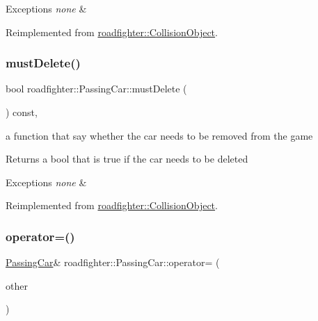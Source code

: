 \begin{DoxyExceptions}{Exceptions}
{\em none} & \\
\hline
\end{DoxyExceptions}


Reimplemented from \hyperlink{classroadfighter_1_1CollisionObject_a9a5265d810f0ed7583b60046ab3fa88c}{roadfighter\+::\+Collision\+Object}.

\mbox{\label{classroadfighter_1_1PassingCar_a96b365c19d4e6e940d3827319434a022}} 
\subsubsection{\texorpdfstring{must\+Delete()}{mustDelete()}}
{\footnotesize\ttfamily bool roadfighter\+::\+Passing\+Car\+::must\+Delete (\begin{DoxyParamCaption}{ }\end{DoxyParamCaption}) const\hspace{0.3cm}{\ttfamily [override]}, {\ttfamily [virtual]}}

a function that say whether the car needs to be removed from the game \begin{DoxyReturn}{Returns}
a bool that is true if the car needs to be deleted 
\end{DoxyReturn}

\begin{DoxyExceptions}{Exceptions}
{\em none} & \\
\hline
\end{DoxyExceptions}


Reimplemented from \hyperlink{classroadfighter_1_1CollisionObject_a738071cd7b1b8cd4c8d455b5e552bd4c}{roadfighter\+::\+Collision\+Object}.

\mbox{\label{classroadfighter_1_1PassingCar_aa3cbe5aa96205e8b7f4ba99531e47735}} 
\subsubsection{\texorpdfstring{operator=()}{operator=()}\hspace{0.1cm}{\footnotesize\ttfamily [1/2]}}
{\footnotesize\ttfamily \hyperlink{classroadfighter_1_1PassingCar}{Passing\+Car}\& roadfighter\+::\+Passing\+Car\+::operator= (\begin{DoxyParamCaption}\item[{const \hyperlink{classroadfighter_1_1PassingCar}{Passing\+Car} \&}]{other }\end{DoxyParamCaption})\hspace{0.3cm}{\ttfamily [default]}}

